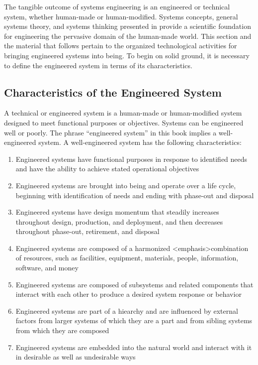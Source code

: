 The tangible outcome of systems engineering is an engineered or technical system, whether human-made or human-modified. Systems concepts, general systems theory, and systems thinking presented in provide a scientific foundation for engineering the pervasive domain of the human-made world. This section and the material that follows pertain to the organized technological activities for bringing engineered systems into being. To begin on solid ground, it is necessary to define the engineered system in terms of its characteristics.

\subsection{Characteristics of the Engineered System}

A technical or engineered system is a human-made or human-modified system designed to meet functional purposes or objectives. Systems can be engineered well or poorly. The phrase ``engineered system'' in this book implies a well-engineered system. A well-engineered system has the following characteristics:

\begin{enumerate}
\item Engineered systems have functional purposes in response to identified needs and have the ability to achieve stated operational objectives
\item Engineered systems are brought into being and operate over a life cycle, beginning with identification of needs and ending with phase-out and disposal
\item Engineered systems have design momentum that steadily increases throughout design, production, and deployment, and then decreases throughout phase-out, retirement, and disposal
\item Engineered systems are composed of a harmonized <emphasis>combination of resources, such as facilities, equipment, materials, people, information, software, and money
\item Engineered systems are composed of subsystems and related components that interact with each other to produce a desired system response or behavior
\item Engineered systems are part of a hiearchy and are influenced by external factors from larger systems of which they are a part and from sibling systems from which they are composed
\item Engineered systems are embedded into the natural world and interact with it in desirable as well as undesirable ways
\end{enumerate}

